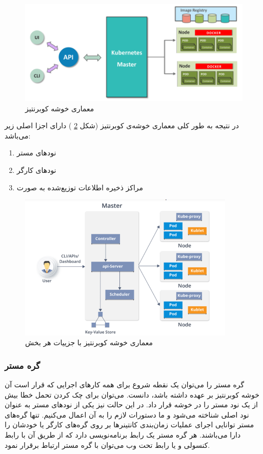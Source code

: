 \begin{figure}[!h]
	\centering
	\includegraphics[height=5cm]{fig2-10}
	\caption{معماری خوشه کوبرنتیز}
	\label{تصویر 2-10}
\end{figure}

در نتیجه به طور کلی معماری خوشه‌ی کوبرنتیز (شکل
\ref{تصویر 2-11}
) دارای اجزا اصلی زیر می‌باشد:

\begin{enumerate}
	\item 
	نودهای مستر
	\item 
	نود‌های کارگر
	\item 
	مراکز ذخیره اطلاعات توزیع‌شده به صورت
\end{enumerate}

\begin{figure}[!h]
	\centering
	\includegraphics[height=7cm]{fig2-11}
	\caption{ معماری خوشه کوبرنتیز با جزییات هر بخش}
	\label{تصویر 2-11}
\end{figure}


\subsubsection*{گره مستر}
گره مستر را می‌توان یک نقطه شروع برای همه کارهای اجرایی که قرار است آن خوشه کوبرنتیز بر عهده داشته باشد، دانست. می‌توان برای چک کردن تحمل خطا بیش از یک نود مستر را در خوشه قرار داد. در این حالت نیز یکی از نودهای مستر به عنوان نود اصلی شناخته می‌شود و ما دستورات لازم را به آن اعمال می‌کنیم. تنها گره‌های مستر توانایی اجرای عملیات زمان‌بندی کانتینرها بر روی گره‌های کارگر یا خودشان را دارا می‌باشند. هر گره مستر یک رابط برنامه‌نویسی دارد که از طریق آن با رابط کنسولی و یا رابط تحت وب می‌توان با گره مستر ارتباط برقرار نمود.

